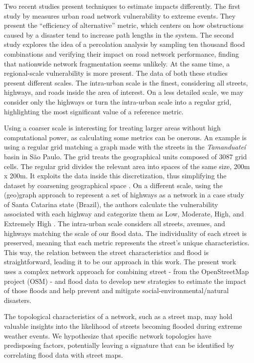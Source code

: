 \documentclass[sn-nature]{sn-jnl}%
\theoremstyle{thmstyleone}%
\theoremstyle{thmstyletwo}%
\theoremstyle{thmstylethree}%
\begin{document}
Two recent studies present techniques to estimate impacts differently.
The first study by \cite{Morelli2021} measures urban road network vulnerability to extreme events.
They present the ``efficiency of alternative'' metric, which centers on how obstructions caused by a disaster tend to increase path lengths in the system.
The second study \cite{vanGinkel2022} explores the idea of a percolation analysis by sampling ten thousand flood combinations and verifying their impact on road network performance, finding that nationwide network fragmentation seems unlikely. At the same time, a regional-scale vulnerability is more present.
The data of both these studies present different scales.
The intra-urban scale is the finest, considering all streets, highways, and roads inside the area of interest.
On a less detailed scale, we may consider only the highways or turn the intra-urban scale into a regular grid, highlighting the most significant value of a reference metric.

Using a coarser scale is interesting for treating larger areas without high computational power, as calculating some metrics can be onerous. An example is using a regular grid matching a graph made with the streets in the \textit{Tamanduateí} basin in São Paulo. The grid treats the geographical units composed of $3087$ grid cells.
The regular grid divides the relevant area into spaces of the same size, 200m x 200m. It exploits the data inside this discretization, thus simplifying the dataset by coarsening geographical space \cite{Tomas2022}.
On a different scale, using the (geo)graph approach to represent a set of highways as a network in a case study of Santa Catarina state (Brazil), the authors calculate the vulnerability associated with each highway and categorize them as Low, Moderate, High, and Extremely High \cite{frontiers_vul}.
The intra-urban scale considers all streets, avenues, and highways matching the scale of our flood data. The individuality of each street is preserved, meaning that each metric represents the street's unique characteristics.
This way, the relation between the street characteristics and flood is straightforward, leading it to be our approach in this work.
The present work uses a complex network approach for combining street - from the OpenStreetMap project (OSM) - and flood data to develop new strategies to estimate the impact of those floods and help prevent and mitigate social-environmental/natural disasters.

The topological characteristics of a network, such as a street map, may hold valuable insights into the likelihood of streets becoming flooded during extreme weather events.
We hypothesize that specific network topologies have predisposing factors, potentially leaving a signature that can be identified by correlating flood data with street maps.
\end{document}

